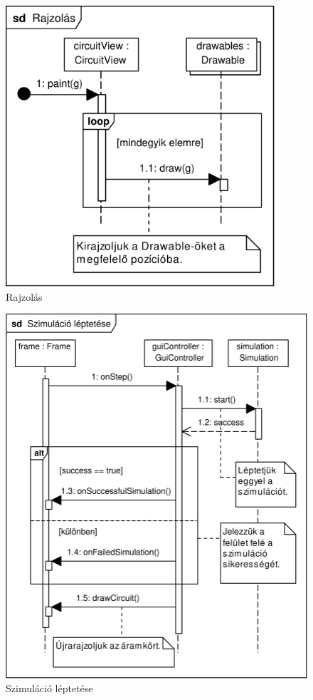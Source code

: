 \begin{figure}[h]
\begin{center}
\includegraphics[width=10cm]{chapters/chapter11/pdfs/6_paint2.pdf}
\caption{Rajzolás}
\label{fig:paint2}
\end{center}
\end{figure}

\begin{figure}[h]
\begin{center}
\includegraphics[width=15cm]{chapters/chapter11/pdfs/7_step.pdf}
\caption{Szimuláció léptetése}
\label{fig:step}
\end{center}
\end{figure}


